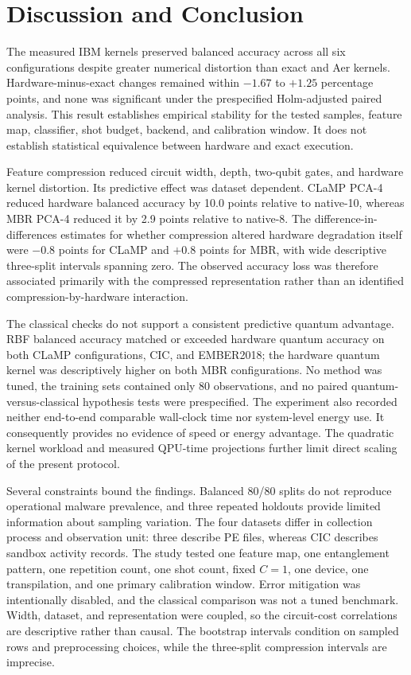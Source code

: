 \section{Discussion and Conclusion}

The measured IBM kernels preserved balanced accuracy across all six configurations despite greater numerical distortion than exact and Aer kernels. Hardware-minus-exact changes remained within $-1.67$ to $+1.25$ percentage points, and none was significant under the prespecified Holm-adjusted paired analysis. This result establishes empirical stability for the tested samples, feature map, classifier, shot budget, backend, and calibration window. It does not establish statistical equivalence between hardware and exact execution.

Feature compression reduced circuit width, depth, two-qubit gates, and hardware kernel distortion. Its predictive effect was dataset dependent. CLaMP PCA-4 reduced hardware balanced accuracy by 10.0 points relative to native-10, whereas MBR PCA-4 reduced it by 2.9 points relative to native-8. The difference-in-differences estimates for whether compression altered hardware degradation itself were $-0.8$ points for CLaMP and $+0.8$ points for MBR, with wide descriptive three-split intervals spanning zero. The observed accuracy loss was therefore associated primarily with the compressed representation rather than an identified compression-by-hardware interaction.

The classical checks do not support a consistent predictive quantum advantage. RBF balanced accuracy matched or exceeded hardware quantum accuracy on both CLaMP configurations, CIC, and EMBER2018; the hardware quantum kernel was descriptively higher on both MBR configurations. No method was tuned, the training sets contained only 80 observations, and no paired quantum-versus-classical hypothesis tests were prespecified. The experiment also recorded neither end-to-end comparable wall-clock time nor system-level energy use. It consequently provides no evidence of speed or energy advantage. The quadratic kernel workload and measured QPU-time projections further limit direct scaling of the present protocol.

Several constraints bound the findings. Balanced 80/80 splits do not reproduce operational malware prevalence, and three repeated holdouts provide limited information about sampling variation. The four datasets differ in collection process and observation unit: three describe PE files, whereas CIC describes sandbox activity records. The study tested one feature map, one entanglement pattern, one repetition count, one shot count, fixed $C=1$, one device, one transpilation, and one primary calibration window. Error mitigation was intentionally disabled, and the classical comparison was not a tuned benchmark. Width, dataset, and representation were coupled, so the circuit-cost correlations are descriptive rather than causal. The bootstrap intervals condition on sampled rows and preprocessing choices, while the three-split compression intervals are imprecise.

